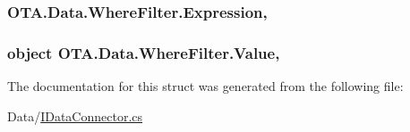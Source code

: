 \subsubsection[{Expression}]{ O\+T\+A.\+Data.\+Where\+Filter.\+Expression\hspace{0.3cm}{\ttfamily [get]}, {\ttfamily [set]}}\label{struct_o_t_a_1_1_data_1_1_where_filter_aea3259b04d6c9d636e0b499fe492c64f}
\hypertarget{struct_o_t_a_1_1_data_1_1_where_filter_aa3e42f1a208b807654ed853a70788b1d}{}
\subsubsection[{Value}]{\setlength{\rightskip}{0pt plus 5cm}object O\+T\+A.\+Data.\+Where\+Filter.\+Value\hspace{0.3cm}{\ttfamily [get]}, {\ttfamily [set]}}\label{struct_o_t_a_1_1_data_1_1_where_filter_aa3e42f1a208b807654ed853a70788b1d}


The documentation for this struct was generated from the following file\+:\begin{DoxyCompactItemize}
\item 
Data/\hyperlink{_i_data_connector_8cs}{I\+Data\+Connector.\+cs}\end{DoxyCompactItemize}
